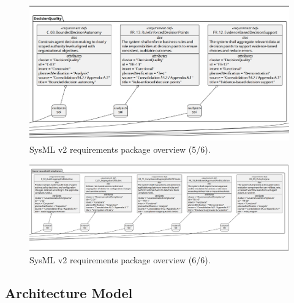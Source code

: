 \begin{figure}[htbp]
  \centering
  \includegraphics[width=\linewidth]{ressources/MAS/figures/MASRequirements/MASRequirements5.jpeg}
  \caption{SysML v2 requirements package overview (5/6).}
  \label{fig:mas-reqs-5}
\end{figure}
\begin{figure}[htbp]
  \centering
  \includegraphics[width=\linewidth]{ressources/MAS/figures/MASRequirements/MASRequirements6.jpeg}
  \caption{SysML v2 requirements package overview (6/6).}
  \label{fig:mas-reqs-6}
\end{figure}



\clearpage
\subsection*{Architecture Model}\label{app:arch-mod}
